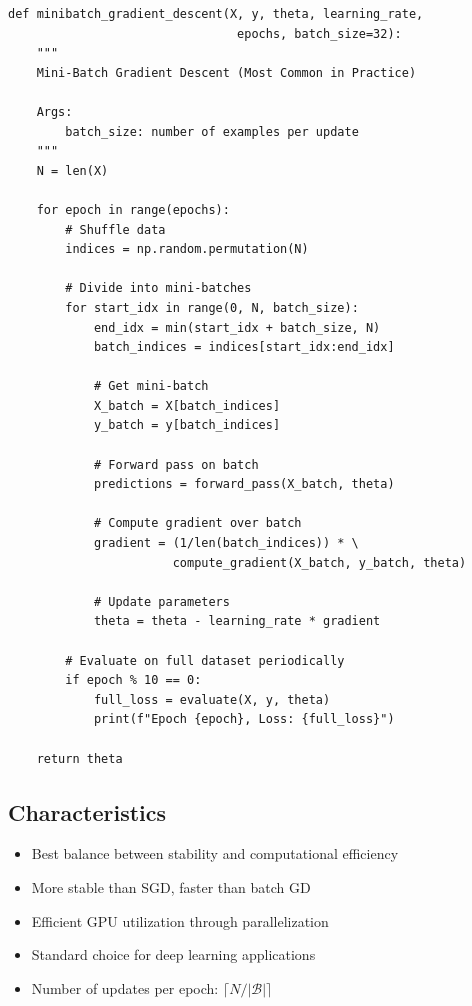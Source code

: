 \documentclass{tufte-handout}
\begin{document}
\begin{lstlisting}
def minibatch_gradient_descent(X, y, theta, learning_rate, 
                                epochs, batch_size=32):
    """
    Mini-Batch Gradient Descent (Most Common in Practice)
    
    Args:
        batch_size: number of examples per update
    """
    N = len(X)
    
    for epoch in range(epochs):
        # Shuffle data
        indices = np.random.permutation(N)
        
        # Divide into mini-batches
        for start_idx in range(0, N, batch_size):
            end_idx = min(start_idx + batch_size, N)
            batch_indices = indices[start_idx:end_idx]
            
            # Get mini-batch
            X_batch = X[batch_indices]
            y_batch = y[batch_indices]
            
            # Forward pass on batch
            predictions = forward_pass(X_batch, theta)
            
            # Compute gradient over batch
            gradient = (1/len(batch_indices)) * \
                       compute_gradient(X_batch, y_batch, theta)
            
            # Update parameters
            theta = theta - learning_rate * gradient
        
        # Evaluate on full dataset periodically
        if epoch % 10 == 0:
            full_loss = evaluate(X, y, theta)
            print(f"Epoch {epoch}, Loss: {full_loss}")
    
    return theta
\end{lstlisting}

\subsection{Characteristics}
\begin{itemize}
    \item Best balance between stability and computational efficiency
    \item More stable than SGD, faster than batch GD
    \item Efficient GPU utilization through parallelization
    \item Standard choice for deep learning applications
    \item Number of updates per epoch: $\lceil N / |\mathcal{B}| \rceil$
\end{itemize}
\end{document}
